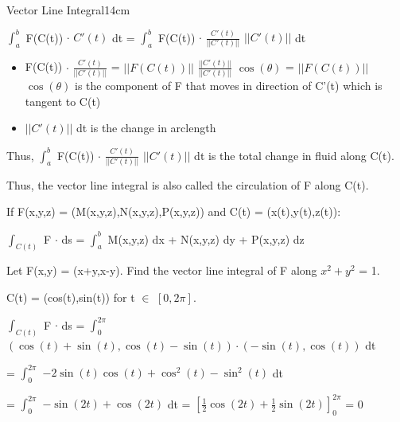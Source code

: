 \begin{definition}{Vector Line Integral}{14cm}
\begin{minipage}{13.5cm}
            \hspace{0.5cm}
            $\int_a^b$ F(C(t)) $\cdot$ $C'(t)$ dt
            = $\int_a^b$ F(C(t)) $\cdot$ $\frac{C'(t)}{||C'(t)||}$ $||C'(t)||$ dt

            \begin{itemize}[leftmargin=0.5cm, itemsep=0.01cm]
                \item F(C(t)) $\cdot$ $\frac{C'(t)}{||C'(t)||}$
                    = $||F(C(t))||$ $\frac{||C'(t)||}{||C'(t)||}$ $\cos(\theta)$
                    = $||F(C(t))||$ $\cos(\theta)$
                    is the component of F that moves in direction of C'(t)
                    which is tangent to C(t)

                \item $||C'(t)||$ dt is the change in arclength
            \end{itemize}

            Thus, $\int_a^b$ F(C(t)) $\cdot$
                            $\frac{C'(t)}{||C'(t)||}$ $||C'(t)||$ dt
            is the total change in fluid along C(t).

            Thus, the vector line integral is also called the
            {\color{lblue} circulation of F along C(t)}.
        \end{minipage}

        \vspace{0.3cm}



        If F(x,y,z) = (M(x,y,z),N(x,y,z),P(x,y,z)) and C(t) = (x(t),y(t),z(t)):

        \hspace{0.5cm}
        $\int_{C(t)}$ F $\cdot$ ds
        = $\int_a^b$ M(x,y,z) dx + N(x,y,z) dy + P(x,y,z) dz
    \end{definition}

    \vspace{0.5cm}



    \begin{example}
        Let F(x,y) = (x+y,x-y).
        Find the vector line integral of F along $x^2+y^2$ = 1.
    \end{example}

    \begin{tbox}
        C(t) = (cos(t),sin(t)) for t $\in$ $[0,2\pi]$.

        $\int_{C(t)}$ F $\cdot$ ds
        = $\int_0^{2\pi}$
            $(\cos(t)+\sin(t),\cos(t)-\sin(t)) \cdot (-\sin(t),\cos(t))$ dt

        \hspace{2cm}
        = $\int_0^{2\pi}$ $-2\sin(t)\cos(t) + \cos^2(t) - \sin^2(t)$ dt

        \hspace{2cm}
        = $\int_0^{2\pi}$ $-\sin(2t) + \cos(2t)$ dt
        = $[\frac{1}{2}\cos(2t) + \frac{1}{2}\sin(2t)]_0^{2\pi}$
        = 0
    \end{tbox}

